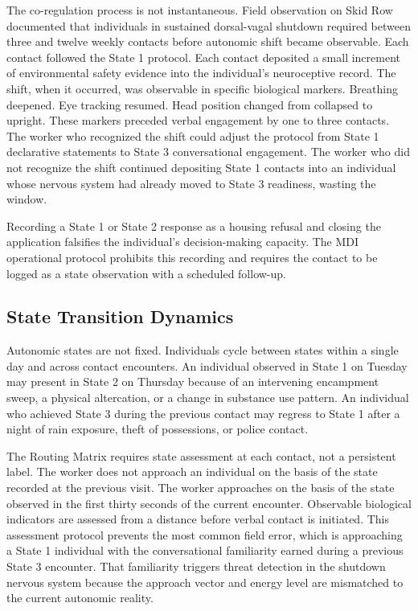 \documentclass[12pt, letterpaper]{article}
\begin{document}
The co-regulation process is not instantaneous. Field observation on Skid Row documented that individuals in sustained dorsal-vagal shutdown required between three and twelve weekly contacts before autonomic shift became observable. Each contact followed the State 1 protocol. Each contact deposited a small increment of environmental safety evidence into the individual's neuroceptive record. The shift, when it occurred, was observable in specific biological markers. Breathing deepened. Eye tracking resumed. Head position changed from collapsed to upright. These markers preceded verbal engagement by one to three contacts. The worker who recognized the shift could adjust the protocol from State 1 declarative statements to State 3 conversational engagement. The worker who did not recognize the shift continued depositing State 1 contacts into an individual whose nervous system had already moved to State 3 readiness, wasting the window.

Recording a State 1 or State 2 response as a housing refusal and closing the application falsifies the individual's decision-making capacity. The MDI operational protocol prohibits this recording and requires the contact to be logged as a state observation with a scheduled follow-up.

\subsection{State Transition Dynamics}

Autonomic states are not fixed. Individuals cycle between states within a single day and across contact encounters. An individual observed in State 1 on Tuesday may present in State 2 on Thursday because of an intervening encampment sweep, a physical altercation, or a change in substance use pattern. An individual who achieved State 3 during the previous contact may regress to State 1 after a night of rain exposure, theft of possessions, or police contact.

The Routing Matrix requires state assessment at each contact, not a persistent label. The worker does not approach an individual on the basis of the state recorded at the previous visit. The worker approaches on the basis of the state observed in the first thirty seconds of the current encounter. Observable biological indicators are assessed from a distance before verbal contact is initiated. This assessment protocol prevents the most common field error, which is approaching a State 1 individual with the conversational familiarity earned during a previous State 3 encounter. That familiarity triggers threat detection in the shutdown nervous system because the approach vector and energy level are mismatched to the current autonomic reality.
\end{document}
